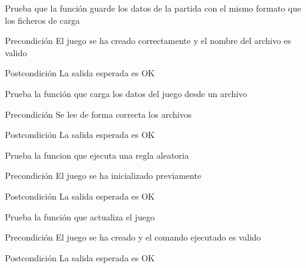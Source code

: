 \begin{DoxyRefList}
\item[\label{test__test000054}%
\hypertarget{test__test000054}{}%
Global \hyperlink{game__management__test_8c_a2d6ccbade0292cbdf325b04dbd8b45c2}{test1\-\_\-game\-\_\-management\-\_\-save} ()]Prueba que la función guarde los datos de la partida con el mismo formato que los ficheros de carga \begin{DoxyPrecond}{Precondición}
El juego se ha creado correctamente y el nombre del archivo es valido 
\end{DoxyPrecond}
\begin{DoxyPostcond}{Postcondición}
La salida esperada es O\-K  
\end{DoxyPostcond}

\item[\label{test__test000052}%
\hypertarget{test__test000052}{}%
Global \hyperlink{game__management__test_8c_a1ecf4ee9181b0959b4233978d5494430}{test1\-\_\-game\-\_\-management\-\_\-start\-\_\-from\-\_\-file} ()]Prueba la función que carga los datos del juego desde un archivo \begin{DoxyPrecond}{Precondición}
Se lee de forma correcta los archivos 
\end{DoxyPrecond}
\begin{DoxyPostcond}{Postcondición}
La salida esperada es O\-K  
\end{DoxyPostcond}

\item[\label{test__test000058}%
\hypertarget{test__test000058}{}%
Global \hyperlink{game__rules__test_8c_a1c2fc4e2d92550eea8004783c8038c20}{test1\-\_\-game\-\_\-rules\-\_\-run\-\_\-random\-\_\-rule} ()]Prueba la funcion que ejecuta una regla aleatoria \begin{DoxyPrecond}{Precondición}
El juego se ha inicializado previamente 
\end{DoxyPrecond}
\begin{DoxyPostcond}{Postcondición}
La salida esperada es O\-K  
\end{DoxyPostcond}

\item[\label{test__test000063}%
\hypertarget{test__test000063}{}%
Global \hyperlink{game__test_8c_acef689d23c451c738aab116984001501}{test1\-\_\-game\-\_\-update} ()]Prueba la función que actualiza el juego \begin{DoxyPrecond}{Precondición}
El juego se ha creado y el comando ejecutado es valido 
\end{DoxyPrecond}
\begin{DoxyPostcond}{Postcondición}
La salida esperada es O\-K  
\end{DoxyPostcond}


\end{DoxyRefList}
